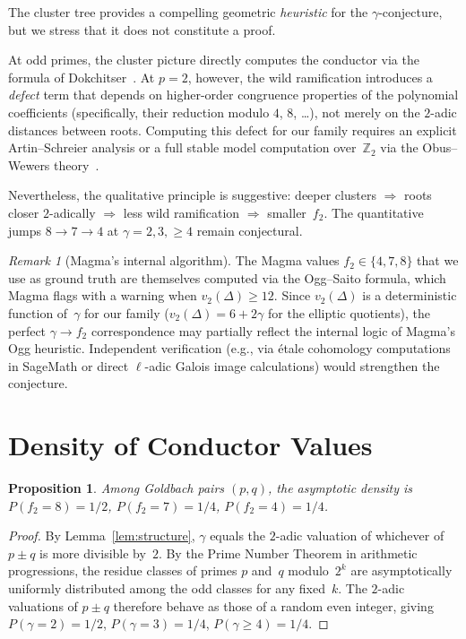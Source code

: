 \documentclass[11pt,a4paper]{article}
\newtheorem{proposition}[theorem]{Proposition}
\theoremstyle{definition}
\theoremstyle{remark}
\newtheorem{remark}[theorem]{Remark}
\begin{document}
The cluster tree provides a compelling geometric
\emph{heuristic} for the $\gamma$-conjecture, but we
stress that it does not constitute a proof.

At odd primes, the cluster picture directly computes
the conductor via the formula of
Dokchitser~\cite{Dokchitser}.  At $p = 2$, however,
the wild ramification introduces a \emph{defect} term
that depends on higher-order congruence properties of
the polynomial coefficients (specifically, their
reduction modulo $4$, $8$, \ldots), not merely on the
$2$-adic distances between roots.  Computing this defect
for our family requires an explicit Artin--Schreier
analysis or a full stable model computation
over~$\mathbb{Z}_2$ via the Obus--Wewers
theory~\cite{ObusWewers}.

Nevertheless, the qualitative principle is suggestive:
deeper clusters $\Longrightarrow$ roots closer
$2$-adically $\Longrightarrow$ less wild ramification
$\Longrightarrow$ smaller~$f_2$.
The quantitative jumps $8 \to 7 \to 4$ at
$\gamma = 2, 3, \ge 4$ remain conjectural.

\begin{remark}[Magma's internal algorithm]\label{rem:magma}
  The Magma values $f_2 \in \{4, 7, 8\}$ that we use as
  ground truth are themselves computed via the Ogg--Saito
  formula, which Magma flags with a warning when
  $v_2(\Delta) \ge 12$.  Since $v_2(\Delta)$ is a
  deterministic function of~$\gamma$ for our family
  ($v_2(\Delta) = 6 + 2\gamma$ for the elliptic
  quotients), the
  perfect $\gamma \to f_2$ correspondence may partially
  reflect the internal logic of Magma's Ogg heuristic.
  Independent verification (e.g., via \'etale cohomology
  computations in SageMath or direct $\ell$-adic Galois
  image calculations) would strengthen the conjecture.
\end{remark}


\section{Density of Conductor Values}\label{sec:density}

\begin{proposition}\label{prop:density}
  Among Goldbach pairs $(p, q)$, the asymptotic density is
  $P(f_2 = 8) = 1/2$, $P(f_2 = 7) = 1/4$,
  $P(f_2 = 4) = 1/4$.
\end{proposition}

\begin{proof}
  By Lemma~\ref{lem:structure}, $\gamma$ equals the
  $2$-adic valuation of whichever of $p \pm q$ is more
  divisible by~$2$.
  By the Prime Number Theorem in arithmetic progressions,
  the residue classes of primes $p$ and~$q$ modulo~$2^k$
  are asymptotically uniformly distributed among the odd
  classes for any fixed~$k$.  The $2$-adic valuations of
  $p \pm q$ therefore behave as those of a random even
  integer, giving
  $P(\gamma = 2) = 1/2$, $P(\gamma = 3) = 1/4$,
  $P(\gamma \ge 4) = 1/4$.
\end{proof}
\end{document}
